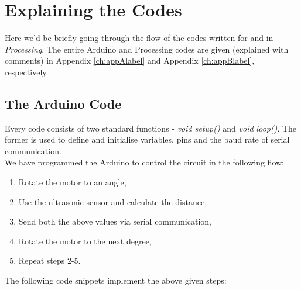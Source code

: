 \chapter{Explaining the Codes}
Here we'd be briefly going through the flow of the codes written for \arduino{} and in \emph{Processing}. The entire Arduino and Processing codes are given (explained with comments) in Appendix \ref{ch:appAlabel} and Appendix \ref{ch:appBlabel}, respectively.
\section{The Arduino Code}
Every \arduino{} code consists of two standard functions - \textit{void setup()} and \textit{void loop()}. The former is used to define and initialise variables, pins and the baud rate of serial communication.\\
We have programmed the Arduino to control the circuit in the following flow:
\begin{enumerate}
	\item Rotate the motor to an angle,
	\item Use the ultrasonic sensor and calculate the distance,
	\item Send both the above values via serial communication,
	\item Rotate the motor to the next degree,
	\item Repeat steps 2-5.
\end{enumerate}
The following code snippets implement the above given steps:
